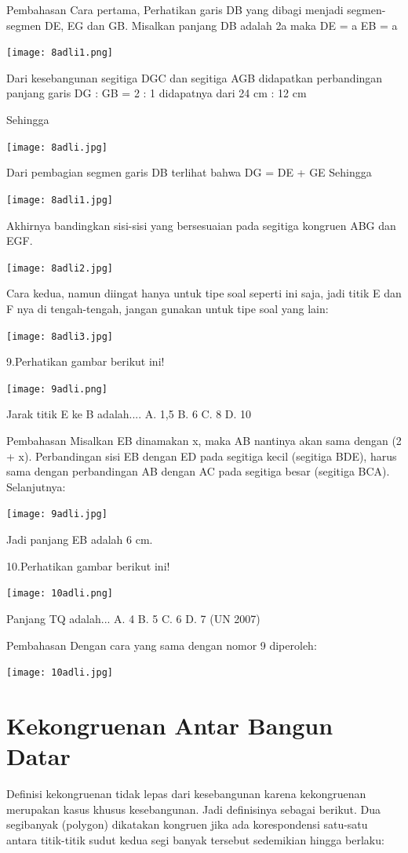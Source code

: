 \documentclass[11pt,fleqn]{book} %
\begin{document}
Pembahasan
Cara pertama,
Perhatikan garis DB yang dibagi menjadi segmen-segmen DE, EG dan GB. 
Misalkan 
panjang DB adalah 2a 
maka 
DE = a 
EB = a 

\texttt{[image: 8adli1.png]}

Dari kesebangunan segitiga DGC dan segitiga AGB didapatkan perbandingan panjang garis
DG : GB = 2 : 1  didapatnya  dari 24 cm : 12 cm

Sehingga

\texttt{[image: 8adli.jpg]}

Dari pembagian segmen garis DB terlihat bahwa
DG = DE + GE
Sehingga

\texttt{[image: 8adli1.jpg]}

Akhirnya bandingkan sisi-sisi yang bersesuaian pada segitiga kongruen ABG dan EGF. 

\texttt{[image: 8adli2.jpg]}

Cara kedua,  namun diingat hanya untuk tipe soal seperti ini saja, jadi titik E dan F nya di tengah-tengah, jangan gunakan untuk tipe soal yang lain: 

\texttt{[image: 8adli3.jpg]}

9.Perhatikan gambar berikut ini! 

\texttt{[image: 9adli.png]}

Jarak titik E ke B adalah....
A. 1,5
B. 6
C. 8
D. 10 

Pembahasan
Misalkan EB dinamakan x, maka AB nantinya akan sama dengan (2 + x). Perbandingan sisi EB dengan ED pada segitiga kecil (segitiga BDE), harus sama dengan perbandingan AB dengan AC pada segitiga besar (segitiga BCA). Selanjutnya: 

\texttt{[image: 9adli.jpg]}
 
Jadi panjang EB adalah 6 cm.

10.Perhatikan gambar berikut ini! 

\texttt{[image: 10adli.png]}

Panjang TQ adalah...
A. 4
B. 5
C. 6
D. 7
(UN 2007) 

Pembahasan
Dengan cara yang sama dengan nomor 9 diperoleh: 

\texttt{[image: 10adli.jpg]}

\section{Kekongruenan Antar Bangun Datar}

Definisi kekongruenan tidak lepas dari kesebangunan karena kekongruenan
merupakan kasus khusus kesebangunan. Jadi definisinya sebagai berikut.
Dua segibanyak (polygon) dikatakan kongruen jika ada korespondensi satu-satu
antara titik-titik sudut kedua segi banyak tersebut sedemikian hingga berlaku: 
\end{document}
